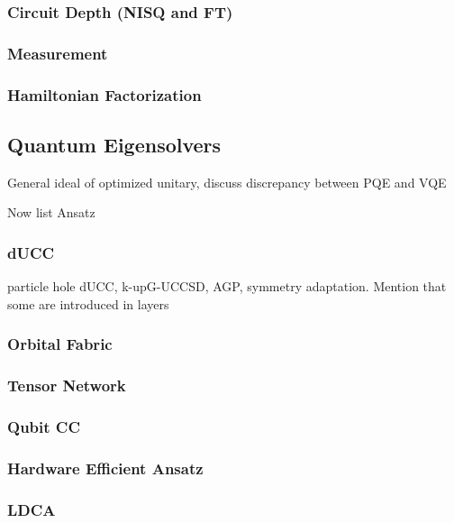 \documentclass[aip,jcp,amsmath,amssymb, reprint]{revtex4-1}
\begin{document}
\subsubsection{Circuit Depth (NISQ and FT)}

\subsubsection{Measurement}

\subsubsection{Hamiltonian Factorization}


\subsection{Quantum Eigensolvers}
General ideal of optimized unitary, discuss discrepancy between PQE and VQE

Now list Ansatz

\subsubsection{dUCC}

particle hole dUCC, k-upG-UCCSD, AGP, symmetry adaptation.
Mention that some are introduced in layers

\subsubsection{Orbital Fabric}

\subsubsection{Tensor Network}

\subsubsection{Qubit CC}

\subsubsection{Hardware Efficient Ansatz}

\subsubsection{LDCA}
\end{document}
